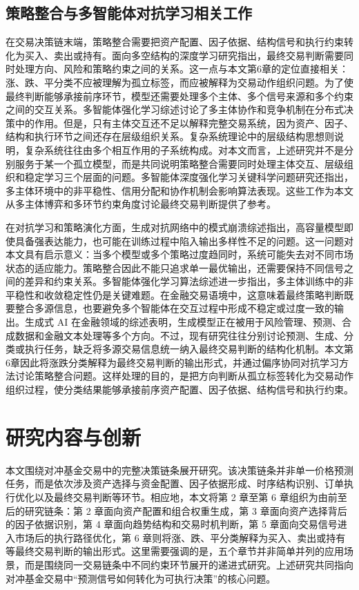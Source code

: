 \subsection{策略整合与多智能体对抗学习相关工作}
在交易决策链末端，策略整合需要把资产配置、因子依据、结构信号和执行约束转化为买入、卖出或持有。面向多空结构的深度学习研究指出，最终交易判断需要同时处理方向、风险和策略约束之间的关系\cite{yang2024deep}。这一点与本文第6章的定位直接相关：涨、跌、平分类不应被理解为孤立标签，而应被解释为交易动作组织问题。为了使最终判断能够承接前序环节，模型还需要处理多个主体、多个信号来源和多个约束之间的交互关系。多智能体强化学习综述讨论了多主体协作和竞争机制在分布式决策中的作用\cite{du2019survey}。但是，只有主体交互还不足以解释完整交易系统，因为资产、因子、结构和执行环节之间还存在层级组织关系。复杂系统理论中的层级结构思想则说明，复杂系统往往由多个相互作用的子系统构成\cite{simon1962architecture}。对本文而言，上述研究并不是分别服务于某一个孤立模型，而是共同说明策略整合需要同时处理主体交互、层级组织和稳定学习三个层面的问题。多智能体深度强化学习关键科学问题研究还指出，多主体环境中的非平稳性、信用分配和协作机制会影响算法表现\cite{sun2020multiagent}。这些工作为本文从多主体博弈和多环节约束角度讨论最终交易判断提供了参考。

在对抗学习和策略演化方面，生成对抗网络中的模式崩溃综述指出，高容量模型即使具备强表达能力，也可能在训练过程中陷入输出多样性不足的问题\cite{barsha2024review}。这一问题对本文具有启示意义：当多个模型或多个策略过度趋同时，系统可能失去对不同市场状态的适应能力。策略整合因此不能只追求单一最优输出，还需要保持不同信号之间的差异和约束关系。多智能体强化学习算法综述进一步指出，多主体训练中的非平稳性和收敛稳定性仍是关键难题\cite{li2024marl}。在金融交易语境中，这意味着最终策略判断既要整合多源信息，也要避免多个智能体在交互过程中形成不稳定或过度一致的输出。生成式 AI 在金融领域的综述表明，生成模型正在被用于风险管理、预测、合成数据和金融文本处理等多个方向\cite{lee2024generative}。不过，现有研究往往分别讨论预测、生成、分类或执行任务，缺乏将多源交易信息统一纳入最终交易判断的结构化机制。本文第6章因此将涨跌分类解释为最终交易判断的输出形式，并通过偏序协同对抗学习方法讨论策略整合问题。这样处理的目的，是把方向判断从孤立标签转化为交易动作组织过程，使分类结果能够承接前序资产配置、因子依据、结构信号和执行约束。


\section{研究内容与创新}
本文围绕对冲基金交易中的完整决策链条展开研究。该决策链条并非单一价格预测任务，而是依次涉及资产选择与资金配置、因子依据形成、时序结构识别、订单执行优化以及最终交易判断等环节。相应地，本文将第 2 章至第 6 章组织为由前至后的研究链条：第 2 章面向资产配置和组合权重生成，第 3 章面向资产选择背后的因子依据识别，第 4 章面向趋势结构和交易时机判断，第 5 章面向交易信号进入市场后的执行路径优化，第 6 章则将涨、跌、平分类解释为买入、卖出或持有等最终交易判断的输出形式。这里需要强调的是，五个章节并非简单并列的应用场景，而是围绕同一交易链条中不同约束环节展开的递进式研究。上述研究共同指向对冲基金交易中“预测信号如何转化为可执行决策”的核心问题。

